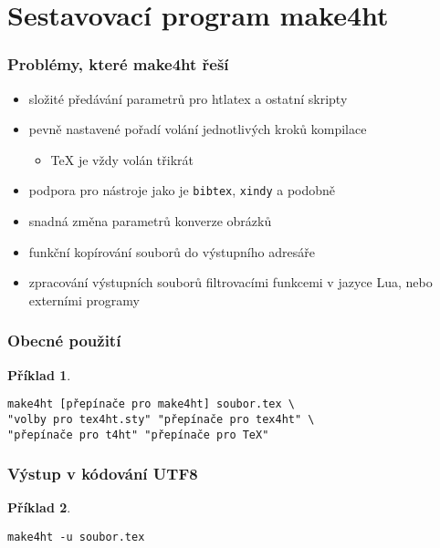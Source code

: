 \documentclass[czech]{beamer}
\newtheorem{priklad}{Příklad}
\begin{document}
\section{Sestavovací program make4ht}
\begin{frame}
  \frametitle{Problémy, které make4ht řeší} 
  \begin{itemize}
    \item složité předávání parametrů pro htlatex a ostatní skripty
    \item pevně nastavené pořadí volání jednotlivých kroků kompilace
      \begin{itemize}
        \item TeX je vždy volán třikrát
      \end{itemize}
    \item podpora pro nástroje jako je \texttt{bibtex}, \texttt{xindy} a podobně
    \item  snadná změna parametrů konverze obrázků
    \item funkční kopírování souborů do výstupního adresáře
    \item zpracování výstupních souborů filtrovacími funkcemi v jazyce Lua, nebo externími
      programy
  \end{itemize}
\end{frame}
\begin{frame}[fragile]
  \frametitle{Obecné použití}
      \begin{priklad}
        \small
\begin{verbatim}
make4ht [přepínače pro make4ht] soubor.tex \ 
"volby pro tex4ht.sty" "přepínače pro tex4ht" \
"přepínače pro t4ht" "přepínače pro TeX"
\end{verbatim}
      \end{priklad}
\end{frame}

\begin{frame}[fragile]
  \frametitle{Výstup v kódování  UTF8}
      \begin{priklad}
\begin{verbatim}
make4ht -u soubor.tex
\end{verbatim}
\end{priklad}

\end{frame}
\end{document}
